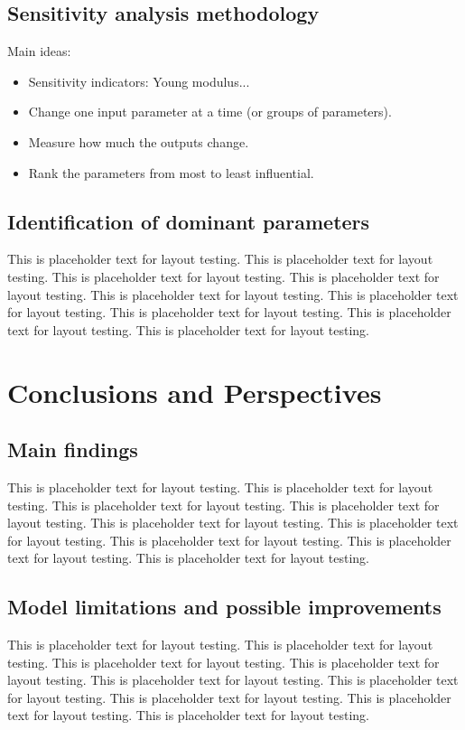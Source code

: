 \documentclass[a4paper,12pt,twoside]{report}     %
\begin{document}
\section{Sensitivity analysis methodology}
Main ideas:
\begin{itemize}
    \item Sensitivity indicators: Young modulus...
    \item Change one input parameter at a time (or groups of parameters).
    \item Measure how much the outputs change.
    \item Rank the parameters from most to least influential.
\end{itemize}

\section{Identification of dominant parameters}
This is placeholder text for layout testing. This is placeholder text for layout testing. This is placeholder text for layout testing. This is placeholder text for layout testing. This is placeholder text for layout testing. This is placeholder text for layout testing. This is placeholder text for layout testing. This is placeholder text for layout testing. This is placeholder text for layout testing.



\cleardoublepage
\chapter{Conclusions and Perspectives}

\section{Main findings}
This is placeholder text for layout testing. This is placeholder text for layout testing. This is placeholder text for layout testing. This is placeholder text for layout testing. This is placeholder text for layout testing. This is placeholder text for layout testing. This is placeholder text for layout testing. This is placeholder text for layout testing. This is placeholder text for layout testing.

\section{Model limitations and possible improvements}
This is placeholder text for layout testing. This is placeholder text for layout testing. This is placeholder text for layout testing. This is placeholder text for layout testing. This is placeholder text for layout testing. This is placeholder text for layout testing. This is placeholder text for layout testing. This is placeholder text for layout testing. This is placeholder text for layout testing.
\end{document}

